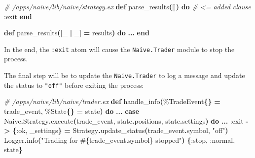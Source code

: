 \documentclass[
  oneside]{book}
\newenvironment{Shaded}{\begin{snugshade}}{\end{snugshade}}
\newcommand{\CommentTok}[1]{\textcolor[rgb]{0.56,0.35,0.01}{\textit{#1}}}
\newcommand{\ConstantTok}[1]{\textcolor[rgb]{0.56,0.35,0.01}{#1}}
\newcommand{\FunctionTok}[1]{\textcolor[rgb]{0.13,0.29,0.53}{\textbf{#1}}}
\newcommand{\KeywordTok}[1]{\textcolor[rgb]{0.13,0.29,0.53}{\textbf{#1}}}
\newcommand{\NormalTok}[1]{#1}
\newcommand{\OperatorTok}[1]{\textcolor[rgb]{0.81,0.36,0.00}{\textbf{#1}}}
\newcommand{\OtherTok}[1]{\textcolor[rgb]{0.56,0.35,0.01}{#1}}
\newcommand{\StringTok}[1]{\textcolor[rgb]{0.31,0.60,0.02}{#1}}
\newcommand{\VariableTok}[1]{\textcolor[rgb]{0.00,0.00,0.00}{#1}}
\begin{document}
\begin{Shaded}
\begin{Highlighting}[]
  \CommentTok{\# /apps/naive/lib/naive/strategy.ex}
  \KeywordTok{def}\NormalTok{ parse\_results}\FunctionTok{(}\OtherTok{[]}\FunctionTok{)} \KeywordTok{do} \CommentTok{\# \textless{}= added clause}
    \VariableTok{:exit}
  \KeywordTok{end}

  \KeywordTok{def}\NormalTok{ parse\_results}\FunctionTok{(}\OtherTok{[}\NormalTok{\_ }\OperatorTok{|}\NormalTok{ \_}\OtherTok{]} \OperatorTok{=}\NormalTok{ results}\FunctionTok{)} \KeywordTok{do}
    \OperatorTok{...}
  \KeywordTok{end}
\end{Highlighting}
\end{Shaded}

In the end, the \texttt{:exit} atom will cause the \texttt{Naive.Trader} module to stop the process.

The final step will be to update the \texttt{Naive.Trader} to log a message and update the status to \texttt{"off"} before exiting the process:

\begin{Shaded}
\begin{Highlighting}[]
  \CommentTok{\# /apps/naive/lib/naive/trader.ex}
  \KeywordTok{def}\NormalTok{ handle\_info}\FunctionTok{(}\NormalTok{\%}\ConstantTok{TradeEvent}\FunctionTok{\{\}} \OperatorTok{=}\NormalTok{ trade\_event, \%}\ConstantTok{State}\FunctionTok{\{\}} \OperatorTok{=}\NormalTok{ state}\FunctionTok{)} \KeywordTok{do}
    \OperatorTok{...}
    \KeywordTok{case} \ConstantTok{Naive}\OperatorTok{.}\ConstantTok{Strategy}\OperatorTok{.}\NormalTok{execute}\FunctionTok{(}\NormalTok{trade\_event, state}\OperatorTok{.}\NormalTok{positions, state}\OperatorTok{.}\NormalTok{settings}\FunctionTok{)} \KeywordTok{do}
      \OperatorTok{...}
      \VariableTok{:exit} \OperatorTok{{-}\textgreater{}}
        \FunctionTok{\{}\VariableTok{:ok}\NormalTok{, \_settings}\FunctionTok{\}} \OperatorTok{=} \ConstantTok{Strategy}\OperatorTok{.}\NormalTok{update\_status}\FunctionTok{(}\NormalTok{trade\_event}\OperatorTok{.}\NormalTok{symbol, }\StringTok{"off"}\FunctionTok{)}
        \ConstantTok{Logger}\OperatorTok{.}\NormalTok{info}\FunctionTok{(}\StringTok{"Trading for }\OtherTok{\#\{}\NormalTok{trade\_event}\OperatorTok{.}\NormalTok{symbol}\OtherTok{\}}\StringTok{ stopped"}\FunctionTok{)}
        \FunctionTok{\{}\VariableTok{:stop}\NormalTok{, }\VariableTok{:normal}\NormalTok{, state}\FunctionTok{\}}
\end{Highlighting}
\end{Shaded}
\end{document}
